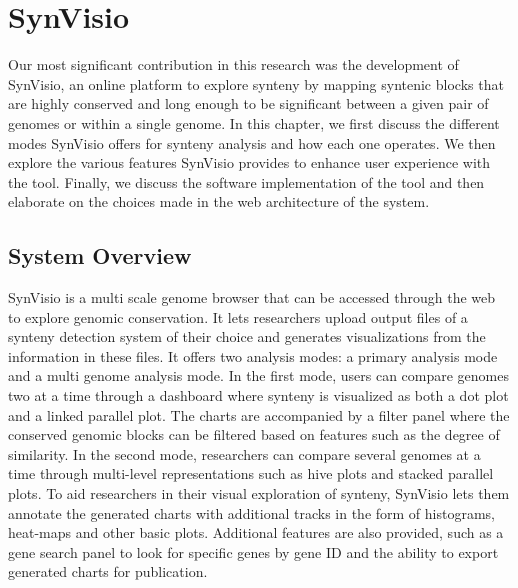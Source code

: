 \chapter{SynVisio}

Our most significant contribution in this research was the development of SynVisio, an online platform to explore synteny by mapping syntenic blocks that are highly conserved and long enough to be significant between a given pair of genomes or within a single genome. In this chapter, we first discuss the different modes SynVisio offers for synteny analysis and how each one operates. We then explore the various features SynVisio provides to enhance user experience with the tool. Finally, we discuss the software implementation of the tool and then elaborate on the choices made in the web architecture of the system.

\section{System Overview}
SynVisio is a multi scale genome browser that can be accessed through the web to explore genomic conservation. It lets researchers upload output files of a synteny detection system of their choice and generates visualizations from the information in these files. It offers two analysis modes: a primary analysis mode and a multi genome analysis mode. In the first mode, users can compare genomes two at a time through a dashboard where synteny is visualized as both a dot plot and a linked parallel plot. The charts are accompanied by a filter panel where the conserved genomic blocks can be filtered based on features such as the degree of similarity. In the second mode, researchers can compare several genomes at a time through multi-level representations such as hive plots and stacked parallel plots. To aid researchers in their visual exploration of synteny, SynVisio lets them annotate the generated charts with additional tracks in the form of histograms, heat-maps and other basic plots. Additional features are also provided, such as a gene search panel to look for specific genes by gene ID and the ability to export generated charts for publication.


